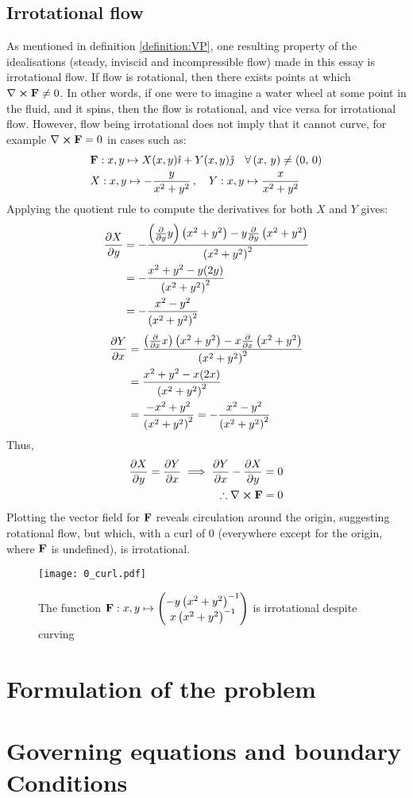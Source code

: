 \subsection{Irrotational flow}\label{section:IRROTATIONAL}
As mentioned in definition \ref{definition:VP}, one resulting property of the idealisations (steady, inviscid and incompressible flow)
made in this essay is irrotational flow. If flow is rotational, then there exists points at which $\curl{\fatf}\neq0$. In other words, if one were to
imagine a water wheel at some point in the fluid, and it spins, then the flow is rotational, and vice versa for irrotational flow.
However, flow being irrotational does not imply that it cannot curve, for example $\curl{\fatf}=0$ in cases such as:
\begin{align*}
    &\mathbf{F}:x,y\mapsto X(x,y)\hat{\imath}+Y(x,y)\hat{\jmath}\quad\forall\left(x,\,y\right)\neq\left(0,\,0\right)\\
    &X:x,y\mapsto-\frac{y}{x^2+y^2}\,,\quad Y:x,y\mapsto\frac{x}{x^2+y^2}
\end{align*}
Applying the quotient rule to compute the derivatives for both $X$ and $Y$ gives:
\begin{align*}
    \pdv{X}{y}&=-\frac{\left(\pdv{y}y\right)\left(x^2+y^2\right)-y\pdv{y}\left(x^2+y^2\right)}{\left(x^2+y^2\right)^2}\\
    &=-\frac{x^2+y^2-y(2y)}{\left(x^2+y^2\right)^2}\\
    &=-\frac{x^2-y^2}{\left(x^2+y^2\right)^2}
\end{align*}
\begin{align*}
    \pdv{Y}{x}&=\frac{\left(\pdv{x}x\right)\left(x^2+y^2\right)-x\pdv{x}\left(x^2+y^2\right)}{\left(x^2+y^2\right)^2}\\
    &=\frac{x^2+y^2-x(2x)}{\left(x^2+y^2\right)^2}\\
    &=\frac{-x^2+y^2}{\left(x^2+y^2\right)^2}=-\frac{x^2-y^2}{\left(x^2+y^2\right)^2}
\end{align*}
Thus,
\begin{align*}
    \pdv{X}{y}=\pdv{Y}{x}\implies\pdv{Y}{x}-\pdv{X}{y}=0\\
    \therefore\curl{\fatf}=0
\end{align*}
Plotting the vector field for $\mathbf{F}$ reveals circulation around the origin, suggesting rotational flow, but which, with a curl of 0 (everywhere except for
the origin, where $\mathbf{F}$ is undefined), is irrotational.
\begin{figure*}[!ht]
    \texttt{[image: 0\_curl.pdf]}
    \centering
    \caption{The function $\mathbf{F}:x,y\mapsto\begin{pmatrix}
        -y\left(x^2+y^2\right)^{-1}\\x\left(x^2+y^2\right)^{-1}
    \end{pmatrix}$ is irrotational despite curving}
    \label{figure:ZEROCURL}
\end{figure*}
\begin{theorem}
\end{theorem}

\section{Formulation of the problem}
\section{Governing equations and boundary Conditions}
